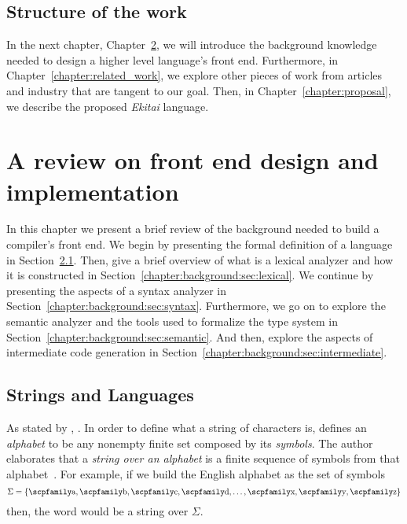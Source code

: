 \documentclass[
  oneside,
  english,
  coorientadorbanca,
  noabntexcite
]{ufsc-thesis-rn46-2019}
\newcommand{\code}[1]{\text{\scpfamily\setlength\spaceskip{0.35em}#1}}
\begin{document}
\section{Structure of the work}

In the next chapter, Chapter~\ref{chapter:background}, we will introduce the background knowledge needed to design a higher level language's front end. Furthermore, in Chapter~\ref{chapter:related_work}, we explore other pieces of work from articles and industry that are tangent to our goal. Then, in Chapter~\ref{chapter:proposal}, we describe the proposed \textit{Ekitai} language.

\chapter{A review on front end design and implementation}\label{chapter:background}

In this chapter we present a brief review of the background needed to build a compiler's front end.
We begin by presenting the formal definition of a language in Section~\ref{ch:background:sec:strings_and_languages}.
Then, give a brief overview of what is a lexical analyzer and how it is constructed in Section~\ref{chapter:background:sec:lexical}.
We continue by presenting the aspects of a syntax analyzer in Section~\ref{chapter:background:sec:syntax}.
Furthermore, we go on to explore the semantic analyzer and the tools used to formalize the type system in Section~\ref{chapter:background:sec:semantic}.
And then, explore the aspects of intermediate code generation in Section~\ref{chapter:background:sec:intermediate}.

\section{Strings and Languages}\label{ch:background:sec:strings_and_languages}

As stated by \textcite{sipser2012introduction}, .
In order to define what a string of characters is, \textcite{sipser2012introduction} defines an \textit{alphabet} to be any nonempty finite set composed by its \textit{symbols}.
The author elaborates that a \textit{string over an alphabet} is a finite sequence of symbols from that alphabet~\cite{sipser2012introduction}.
For example, if we build the English alphabet as the set of symbols
\begin{equation*}
  \Sigma = \{\code{a}, \code{b}, \code{c}, \code{d}, \dots, \code{x}, \code{y}, \code{z}\}
\end{equation*}
then, the word \code{compiler} would be a string over $\Sigma$.
\end{document}
